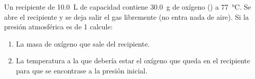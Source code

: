 Un recipiente de \SI{10,0}{\liter} de capacidad contiene \SI{30,0}{\gram} de oxígeno () a \SI{77}{\celsius}. Se abre el recipiente y se deja salir el gas libremente (no entra nada de aire). Si la presión atmosférica es de \SI{1}{\atm} calcule:
\begin{enumerate}[label={\alph*)},font={\color{red!50!black}\bfseries}]
	\item La masa de oxígeno que sale del recipiente.
	\item La temperatura a la que debería estar el oxígeno que queda en el recipiente para que se encontrase a la presión inicial.
\end{enumerate}
